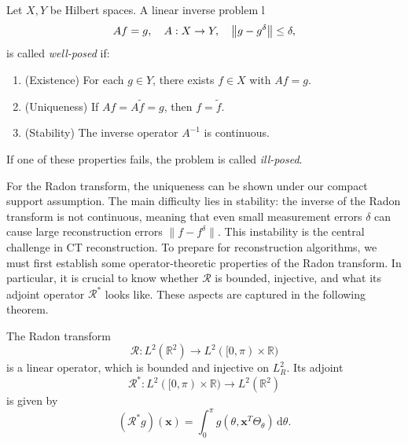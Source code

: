 \documentclass[12pt,a4paper]{article}
\begin{document}
\begin{definition}
    \label{well-posed}
    Let $X,Y$ be Hilbert spaces. A linear inverse problem  
l    \[
        A f = g, \quad A : X \rightarrow Y, \quad \norm{g - g^\delta} \leq \delta,
    \]  
    is called \emph{well-posed} if:
    \begin{enumerate}
        \item (Existence) For each $g \in Y$, there exists $f \in X$ with $Af = g$.
        \item (Uniqueness) If $Af = A\tilde{f} = g$, then $f = \tilde{f}$.
        \item (Stability) The inverse operator $A^{-1}$ is continuous.
    \end{enumerate}
    If one of these properties fails, the problem is called \emph{ill-posed}.
\end{definition}


For the Radon transform, the uniqueness can be shown under our compact support assumption. The main difficulty lies in stability: the inverse of the Radon transform is not continuous, meaning that even small measurement errors $\delta$ can cause large reconstruction errors $\|f - f^\delta\|$. This instability is the central challenge in CT reconstruction.
\newline\newline
To prepare for reconstruction algorithms, we must first establish some operator-theoretic properties of the Radon transform. In particular, it is crucial to know whether $\mathcal{R}$ is bounded, injective, and what its adjoint operator $\mathcal{R}^*$ looks like. These aspects are captured in the following theorem.

\begin{theorem}
\label{inj+bound}
    The Radon transform  
    \[
    \mathcal{R} : L^2(\mathbb R^2) \to L^2([0, \pi) \times \mathbb{R})
    \]  
    is a linear operator, which is bounded and injective on $L^2_R$. Its adjoint  
    \[
    \mathcal{R}^* : L^2([0, \pi) \times \mathbb R) \to L^2(\mathbb R^2)
    \]  
    is given by  
    \[
        (\mathcal{R}^* g)(\mathbf{x}) = \int_0^\pi g(\theta,\mathbf{x}^T \Theta_\theta) \,\mathrm{d}\theta .
    \]
\end{theorem}
\end{document}

